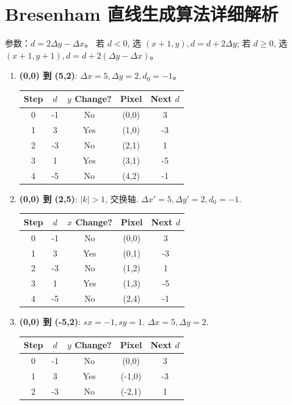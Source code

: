 \documentclass[UTF8]{ctexart}
\begin{document}
\section{Bresenham 直线生成算法详细解析}
参数：$d = 2\Delta y - \Delta x$。 若 $d < 0$, 选 $(x+1,y), d=d+2\Delta y$; 若 $d \ge 0$, 选 $(x+1,y+1), d=d+2(\Delta y-\Delta x)$。

\begin{enumerate}
    \item \textbf{(0,0) 到 (5,2)}: $\Delta x=5, \Delta y=2, d_0=-1$。
    \begin{center}
    \begin{tabular}{ccccc}
    \toprule Step & $d$ & $y$ Change? & Pixel & Next $d$ \\ \midrule
    0 & -1 & No & (0,0) & 3 \\
    1 & 3 & Yes & (1,0) & -3 \\ 2 & -3 & No & (2,1) & 1 \\
    3 & 1 & Yes & (3,1) & -5 \\ 4 & -5 & No & (4,2) & -1 \\ \bottomrule
    \end{tabular}
    \end{center}
    \item \textbf{(0,0) 到 (2,5)}: $|k|>1$, 交换轴. $\Delta x'=5, \Delta y'=2, d_0=-1$.
    \begin{center}
    \begin{tabular}{ccccc}
    \toprule Step & $d$ & $x$ Change? & Pixel & Next $d$ \\ \midrule
    0 & -1 & No & (0,0) & 3 \\
    1 & 3 & Yes & (0,1) & -3 \\ 2 & -3 & No & (1,2) & 1 \\
    3 & 1 & Yes & (1,3) & -5 \\ 4 & -5 & No & (2,4) & -1 \\ \bottomrule
    \end{tabular}
    \end{center}
    \item \textbf{(0,0) 到 (-5,2)}: $sx=-1, sy=1$. $\Delta x=5, \Delta y=2$.
    \begin{center}
    \begin{tabular}{ccccc}
    \toprule Step & $d$ & $y$ Change? & Pixel & Next $d$ \\ \midrule
    0 & -1 & No & (0,0) & 3 \\
    1 & 3 & Yes & (-1,0) & -3 \\ 2 & -3 & No & (-2,1) & 1 \\

\end{tabular}
\end{center}
\end{enumerate}
\end{document}
